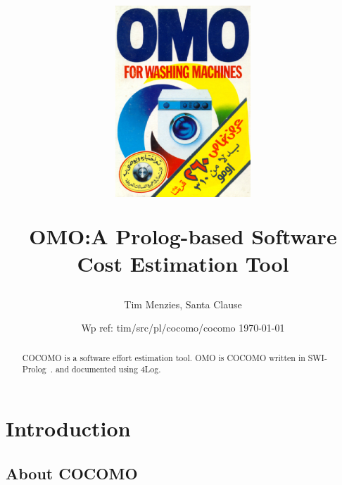\documentclass[twocolumn,global]{svjour}
\date{Wp ref: tim/src/pl/cocomo/cocomo \today}
\newcommand{\ME}{OMO}
\begin{document}
\title{
\begin{minipage}{.3\linewidth}
\includegraphics[width=2in]{omo.eps}\end{minipage}
\begin{minipage}{.6\linewidth}
\ME:\newline A Prolog-based Software Cost Estimation Tool
\end{minipage}}
\author{Tim Menzies, Santa Clause}
\institute{}
\maketitle
\thispagestyle{empty}\pagestyle{plain}
 \begin{abstract}

COCOMO is a software effort estimation tool.
{\ME} is COCOMO written in SWI-Prolog~\cite{swiprolog}. and documented using
{\Tex4Log}.
\end{abstract}

\setcounter{tocdepth}{2}\tableofcontents\newpage%
\section{ Introduction
}
\subsection{ About COCOMO
}

\end{document}
